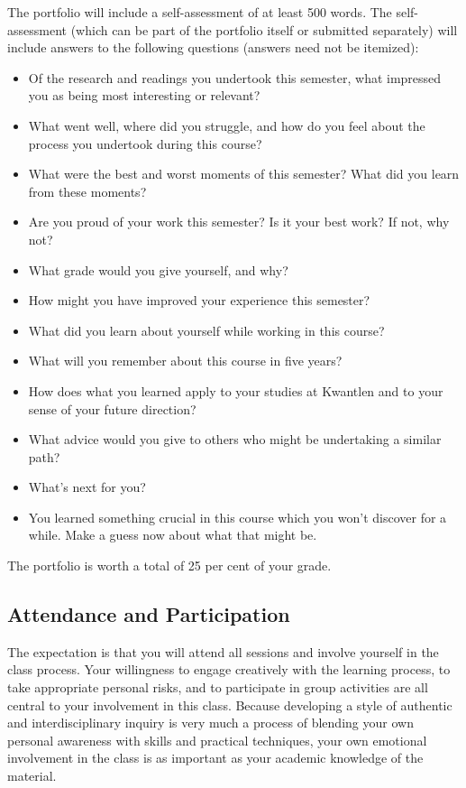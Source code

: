 \documentclass[letterpaper,10pt,headsepline]{scrreprt}
\begin{document}
The portfolio will include a self-assessment of at least 500 words. The self-assessment (which can be part of the portfolio itself or submitted separately) will include answers to the following questions (answers need not be itemized):

 \begin{itemize}

\item Of the research and readings you undertook this semester, what impressed you as being most interesting or relevant?

\item What went well, where did you struggle, and how do you feel about the process you undertook during this course?

\item What were the best and worst moments of this semester? What did you learn from these moments?

\item Are you proud of your work this semester? Is it your best work? If not, why not?

\item What grade would you give yourself, and why?

\item How might you have improved your experience this semester?

\item What did you learn about yourself while working in this course?

\item What will you remember about this course in five years?

\item How does what you learned apply to your studies at Kwantlen and to your sense of your future direction?

\item What advice would you give to others who might be undertaking a similar path?

\item What's next for you?

\item You learned something crucial in this course which you won't discover for a while. Make a guess now about what that might be.

\end{itemize}

The portfolio is worth a total of 25 per cent of your grade.

\subsection{Attendance and Participation}
The expectation is that you will attend all sessions and involve yourself in the class process. Your willingness to engage creatively with the learning process, to take appropriate personal risks, and to participate in group activities are all central to your involvement in this class. Because developing a style of authentic and interdisciplinary inquiry is very much a process of blending your own personal awareness with skills and practical techniques, your own emotional involvement in the class is as important as your academic knowledge of the material.
\end{document}
